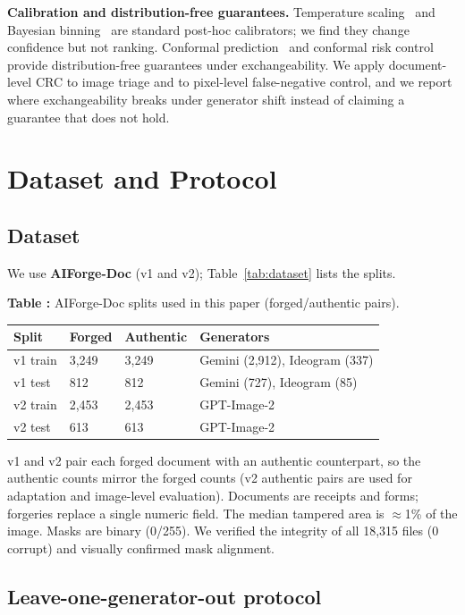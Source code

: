 \documentclass[preprint,12pt]{elsarticle}
\newcounter{tabno}
\newcommand{\tabcaption}[1]{\par\needspace{9\baselineskip}\refstepcounter{tabno}\noindent\textbf{Table \thetabno:} #1\par\vspace{2pt}}
\begin{document}
\textbf{Calibration and distribution-free guarantees.} Temperature scaling~\cite{guo2017calibration} and Bayesian binning~\cite{naeini2015bbq} are standard post-hoc calibrators; we find they change confidence but not ranking. Conformal prediction~\cite{vovk2005conformal} and conformal risk control~\cite{angelopoulos2024crc,bates2021risk} provide distribution-free guarantees under exchangeability. We apply document-level CRC to image triage and to pixel-level false-negative control, and we report where exchangeability breaks under generator shift instead of claiming a guarantee that does not hold.

\section{Dataset and Protocol}\label{dataset-and-protocol}

\subsection{Dataset}\label{dataset}

We use \textbf{AIForge-Doc} (v1 and v2); Table~\ref{tab:dataset} lists the splits.

{
\tabcaption{AIForge-Doc splits used in this paper (forged/authentic pairs).}\label{tab:dataset}
\begin{longtable}[]{@{}llll@{}}
\toprule\noalign{}
Split & Forged & Authentic & Generators \\
\midrule\noalign{}
\endhead
\bottomrule\noalign{}
\endlastfoot
v1 train & 3,249 & 3,249 & Gemini (2,912), Ideogram (337) \\
v1 test & 812 & 812 & Gemini (727), Ideogram (85) \\
v2 train & 2,453 & 2,453 & GPT-Image-2 \\
v2 test & 613 & 613 & GPT-Image-2 \\
\end{longtable}
}

v1 and v2 pair each forged document with an authentic counterpart, so the authentic counts mirror the forged counts (v2 authentic pairs are used for adaptation and image-level evaluation). Documents are receipts and forms; forgeries replace a single numeric field. The median tampered area is $\approx$1\% of the image. Masks are binary (0/255). We verified the integrity of all 18,315 files (0 corrupt) and visually confirmed mask alignment.

\subsection{Leave-one-generator-out protocol}\label{leave-one-generator-out-protocol}
\end{document}
